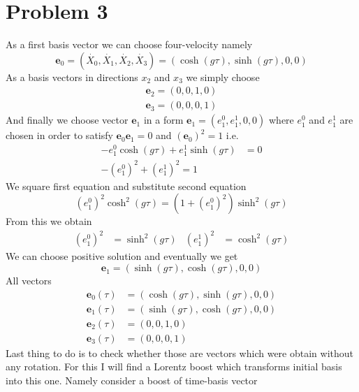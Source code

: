 
\section*{Problem 3}
%
As a first basis vector we can choose four-velocity namely
%
\begin{equation}
	\boldsymbol{e}_0 = \left(\dot{X_0}, \dot{X_1}, \dot{X_2}, \dot{X_3}\right) =
	\left(\cosh(g\tau), \sinh(g\tau), 0, 0\right)
\end{equation}
%
As a basis vectors in directions $x_2$ and $x_3$ we simply choose
%
\begin{align}
	\boldsymbol{e}_2 = \left(0, 0, 1, 0\right) \\
	\boldsymbol{e}_3 = \left(0, 0, 0, 1\right)
\end{align}
%
And finally we choose vector $\boldsymbol{e}_1$ in a form $\boldsymbol{e}_1 =
	\left(e_1^0, e_1^1, 0, 0\right)$ where $e_1^0$ and $e_1^1$ are chosen in order
to satisfy $\boldsymbol{e}_0 \boldsymbol{e}_1 = 0$ and $(\boldsymbol{e}_0)^2=1$ i.e.
%
\begin{align}
	-e_1^0 \cosh(g\tau) + e_1^1 \sinh(g\tau) & = 0 \\
	-(e_1^0)^2 + (e_1^1)^2 = 1
\end{align}
%
We square first equation and substitute second equation
%
\begin{equation}
	(e_1^0)^2 \cosh^2(g\tau) = (1+(e_1^0)^2) \sinh^2(g\tau)
\end{equation}
%
From this we obtain
%
\begin{align}
	(e_1^0)^2 & = \sinh^2(g\tau) & (e_1^1)^2 & = \cosh^2(g\tau)
\end{align}
%
We can choose positive solution and eventually we get
%
\begin{equation}
	\boldsymbol{e}_1 = \left(\sinh(g\tau), \cosh(g\tau), 0, 0\right)
\end{equation}
%
All vectors
%
\begin{align}
	\boldsymbol{e}_0(\tau) & = \left(\cosh(g\tau), \sinh(g\tau), 0, 0\right) \\
	\boldsymbol{e}_1(\tau) & = \left(\sinh(g\tau), \cosh(g\tau), 0, 0\right) \\
	\boldsymbol{e}_2(\tau) & = \left(0, 0, 1, 0\right)                       \\
	\boldsymbol{e}_3(\tau) & = \left(0, 0, 0, 1\right)
\end{align}
%
Last thing to do is to check whether those are vectors which were obtain without
any rotation. For this I will find a Lorentz boost which transforms initial
basis into this one. Namely consider a boost of time-basis vector

